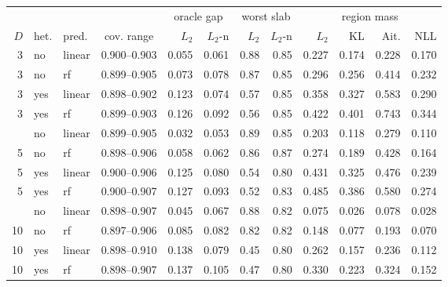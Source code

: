 \begin{tabular}{rllcrrrrrrrr}
\toprule
 & & & & \multicolumn{2}{c}{oracle gap} & \multicolumn{2}{c}{worst slab} & \multicolumn{4}{c}{region mass} \\
\cmidrule(lr){5-6} \cmidrule(lr){7-8} \cmidrule(lr){9-12}
$D$ & het. & pred. & cov. range & $L_2$ & $L_2$-n & $L_2$ & $L_2$-n & $L_2$ & KL & Ait. & NLL \\
\midrule
3 & no & linear & 0.900--0.903 & 0.055 & 0.061 & 0.88 & 0.85 & 0.227 & 0.174 & 0.228 & 0.170 \\
3 & no & rf & 0.899--0.905 & 0.073 & 0.078 & 0.87 & 0.85 & 0.296 & 0.256 & 0.414 & 0.232 \\
3 & yes & linear & 0.898--0.902 & 0.123 & 0.074 & 0.57 & 0.85 & 0.358 & 0.327 & 0.583 & 0.290 \\
3 & yes & rf & 0.899--0.903 & 0.126 & 0.092 & 0.56 & 0.85 & 0.422 & 0.401 & 0.743 & 0.344 \\
\addlinespace
5 & no & linear & 0.899--0.905 & 0.032 & 0.053 & 0.89 & 0.85 & 0.203 & 0.118 & 0.279 & 0.110 \\
5 & no & rf & 0.898--0.906 & 0.058 & 0.062 & 0.86 & 0.87 & 0.274 & 0.189 & 0.428 & 0.164 \\
5 & yes & linear & 0.900--0.906 & 0.125 & 0.080 & 0.54 & 0.80 & 0.431 & 0.325 & 0.476 & 0.239 \\
5 & yes & rf & 0.900--0.907 & 0.127 & 0.093 & 0.52 & 0.83 & 0.485 & 0.386 & 0.580 & 0.274 \\
\addlinespace
10 & no & linear & 0.898--0.907 & 0.045 & 0.067 & 0.88 & 0.82 & 0.075 & 0.026 & 0.078 & 0.028 \\
10 & no & rf & 0.897--0.906 & 0.085 & 0.082 & 0.82 & 0.82 & 0.148 & 0.077 & 0.193 & 0.070 \\
10 & yes & linear & 0.898--0.910 & 0.138 & 0.079 & 0.45 & 0.80 & 0.262 & 0.157 & 0.236 & 0.112 \\
10 & yes & rf & 0.898--0.907 & 0.137 & 0.105 & 0.47 & 0.80 & 0.330 & 0.223 & 0.324 & 0.152 \\
\bottomrule
\end{tabular}
